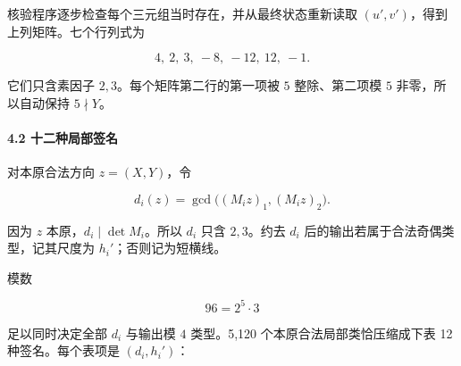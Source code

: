 {核验程序逐步检查每个三元组当时存在，并从最终状态重新读取} \((u',v')\){，得到上列矩阵。七个行列式为}

\[
4,\ 2,\ 3,\ -8,\ -12,\ 12,\ -1.
\]

{它们只含素因子} \(2,3\){。每个矩阵第二行的第一项被} \(5\) {整除、第二项模} \(5\) {非零，所以自动保持} \(5\nmid Y\){。}

\paragraph*{\texorpdfstring{{4.2} {十二种局部签名}}{4.2 十二种局部签名}}\label{C35-h238}

{对本原合法方向} \(z=(X,Y)\){，令}

\[
d_i(z)=\gcd\bigl((M_iz)_1,(M_iz)_2\bigr).
\]

{因为} \(z\) {本原，}\(d_i\mid\det M_i\){。所以} \(d_i\) {只含} \(2,3\){。约去} \(d_i\) {后的输出若属于合法奇偶类型，记其尺度为} \(h_i'\){；否则记为短横线。}

{模数}

\[
96=2^5\cdot3
\]

{足以同时决定全部} \(d_i\) {与输出模} \(4\) {类型。5,120} {个本原合法局部类恰压缩成下表} {12} {种签名。每个表项是} \((d_i,h_i')\){：}


